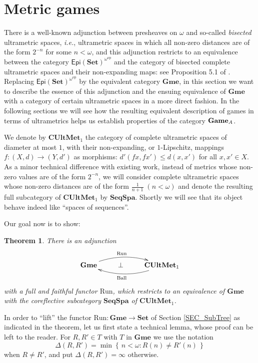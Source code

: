 \documentclass[12pt]{amsart}
\newtheorem{thm}{Theorem}[section]
\theoremstyle{definition}
\newcommand{\set}[1]{\left\{\, {#1} \,\right\}}
\newcommand{\A}{\textup{\textmd{\textsc{A}}}}
\newcommand{\Sets}{\mathbf{Set}}
\newcommand{\CUMet}{\mathbf{CUltMet}_1}
\newcommand{\Games}{\mathbf{Game}}
\newcommand{\Gmes}{\mathbf{Gme}}
\newcommand{\op}{\mathrm{op}}
\begin{document}
\section{Metric games}\label{SEC_MetGames}
There is a well-known adjunction between presheaves on $\omega$ and so-called {\em bisected} ultrametric spaces, {\em i.e.}, ultrametric spaces in which all non-zero distances are of the form $2^{-n}$ for some $n<\omega$, and this adjunction restricts to an equivalence between the category $\mathsf{Epi}(\Sets)^{\omega^{\op}}$ and the category of bisected complete
ultrametric spaces and their non-expanding maps: see Proposition 5.1 of \cite{Birkedal2012}. Replacing $\mathsf{Epi}(\Sets)^{\omega^{\op}}$ by the equivalent category $\Gmes$, in this section we want to describe the essence of this adjunction and the ensuing equivalence of $\Gmes$ with a category of certain ultrametric spaces in a more direct fashion. In the following sections we will see how the resulting equivalent description of games in terms of ultrametrics helps us establish properties of the category $\Games_{\A}$.

We denote by $\CUMet$ the category of complete ultrametric spaces of diameter at most $1$, with their non-expanding, or $1$-Lipschitz, mappings $f\colon (X,d)\to (Y,d')$ as morphisms: $d'(fx,fx')\leq d(x,x')$ for all $x,x'\in X$. As a minor technical difference with existing work, instead of metrics whose non-zero values are of the form $2^{-n}$, we will consider complete ultrametric spaces whose non-zero distances are of the form $\frac{1}{n+1}\; (n<\omega)$ and denote the resulting full subcategory of $\CUMet$  by $\mathbf{SeqSpa}$. Shortly we will see that its object behave indeed like ``spaces of sequences''.

Our goal now is to show:

\begin{thm}\label{THM_GmeUMet}
	There is an adjunction
	$$\xymatrix{\Gmes\ar@/^1.0pc/[rr]^{\mathrm{Run}\quad} &\bot& \CUMet\ar@/^1.0pc/[ll]^{\mathrm{Ball}\quad}
	}$$
	with a full and faithful functor $\mathrm{Run}$, which restricts to an equivalence of $\Gmes$ with the coreflective subcategory $\mathbf{SeqSpa}$ of $\CUMet$.
\end{thm}

In order to ``lift'' the functor $\mathrm{Run}:\Gmes\to\Sets$ of Section \ref{SEC_SubTree} as indicated in the theorem, let us first state a technical lemma, whose proof can be left to the reader. For $R,R'\in T$ with $T$ in $\Gmes$ we use the notation
\[
\Delta(R,R') = \min\set{n<\omega: R(n)\neq R'(n)}
\]
when $R\neq R'$, and put $\Delta(R,R')=\infty$ otherwise.
\end{document}

